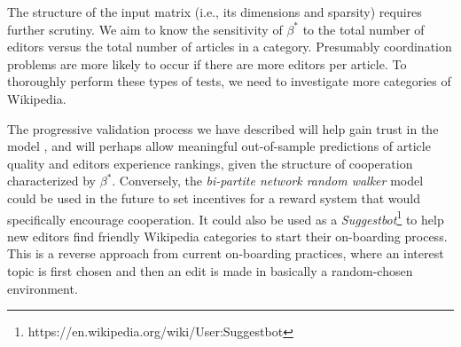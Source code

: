 The structure of the input matrix (i.e., its dimensions and sparsity) requires further scrutiny. We aim to know the sensitivity of $\beta^{*}$ to the total number of editors versus the total number of articles in a category. Presumably coordination  problems are more likely to occur if there are more editors per article. To thoroughly perform these types of tests, we need to investigate more categories of Wikipedia.

The progressive validation process we have described will help gain trust in the model \cite{sornette2007}, and will perhaps allow meaningful out-of-sample predictions of article quality and editors experience rankings, given the structure of cooperation characterized by $\beta^{*}$. Conversely, the {\it bi-partite network random walker} model could be used in the future to set incentives for a reward system that would specifically encourage cooperation. It could also be used as a {\it Suggestbot}\footnote{https://en.wikipedia.org/wiki/User:Suggestbot} to help new editors find friendly Wikipedia categories to start their on-boarding process. This is a reverse approach from current on-boarding practices, where an interest topic is first chosen and then an edit is made in basically a random-chosen environment.



